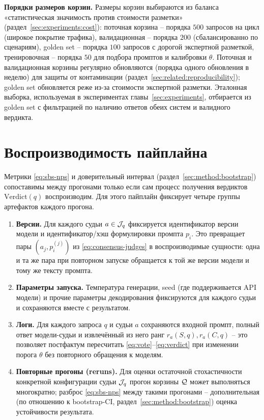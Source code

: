 \textbf{Порядки размеров корзин.}
Размеры корзин выбираются из баланса «статистическая значимость против
стоимости разметки» (раздел~\ref{sec:experiments:cost}): поточная
корзина -- порядка $500$ запросов на цикл (широкое покрытие трафика),
валидационная -- порядка $200$ (сбалансированно по сценариям),
golden set -- порядка $100$ запросов с дорогой экспертной разметкой,
тренировочная -- порядка $50$ для подбора промптов и калибровки $\theta$.
Поточная и валидационная корзины регулярно обновляются (порядка одного
обновления в неделю) для защиты от контаминации
(раздел~\ref{sec:related:reproducibility}); golden set обновляется реже
из-за стоимости экспертной разметки.
Эталонная выборка, используемая в экспериментах
главы~\ref{sec:experiments}, отбирается из golden set с фильтрацией по
наличию ответов обеих систем и валидного вердикта.

\section{Воспроизводимость пайплайна}
\label{sec:method:reproducibility}

Метрики \eqref{eq:sbs-nps} и доверительный интервал
(раздел~\ref{sec:method:bootstrap}) сопоставимы между прогонами только
если сам процесс получения вердиктов $\mathrm{Verdict}(q)$
воспроизводим.
Для этого пайплайн фиксирует четыре группы артефактов каждого прогона.

\begin{enumerate}
    \item \textbf{Версии.} Для каждого судьи $a \in \mathcal{J}_q$
        фиксируется идентификатор версии модели и идентификатор/хэш
        формулировки промпта $p_i$.
        Это превращает пары $(a_j, p_i^{(j)})$ из
        \eqref{eq:consensus-judges} в воспроизводимые сущности: одна и
        та же пара при повторном запуске обращается к той же версии
        модели и тому же тексту промпта.
    \item \textbf{Параметры запуска.} Температура генерации, seed (где
        поддерживается API модели) и прочие параметры декодирования
        фиксируются для каждого судьи и сохраняются вместе с результатом.
    \item \textbf{Логи.} Для каждого запроса $q$ и судьи $a$ сохраняются
        входной промпт, полный ответ модели-судьи и извлечённый из него
        ранг $r_a(S,q), r_a(C,q)$ -- это позволяет постфактум
        пересчитать \eqref{eq:vote}--\eqref{eq:verdict} при изменении
        порога $\theta$ без повторного обращения к моделям.
    \item \textbf{Повторные прогоны (reruns).} Для оценки остаточной
        стохастичности конкретной конфигурации судьи $\mathcal{J}_q$ прогон
        корзины $\mathcal{Q}$ может выполняться многократно; разброс
        \eqref{eq:sbs-nps} между такими прогонами -- дополнительная (по
        отношению к bootstrap-CI, раздел~\ref{sec:method:bootstrap})
        оценка устойчивости результата.
\end{enumerate}

